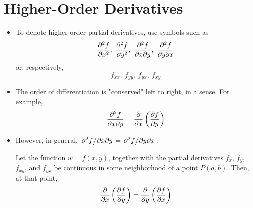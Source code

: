 \documentclass[../main.tex]{subfiles}
\begin{document}
\section{Higher-Order Derivatives}
\begin{itemize}
    \item {}To denote higher-order partial derivatives, use symbols such as
    \begin{equation*}
        \pdv[2]{f}{x},\ \pdv[2]{f}{y},\ \pdv{f}{x}{y},\ \pdv{f}{y}{x}
    \end{equation*}
    or, respectively,
    \begin{equation*}
        f_{xx},\ f_{yy},\ f_{yx},\ f_{xy}
    \end{equation*}
    \item The order of differentiation is "conserved" left to right, in a sense. For example,
    \begin{equation*}
        \pdv{f}{x}{y} = \pdv{x}\left( \pdv{f}{y} \right)
    \end{equation*}
    \item However, in general, $\pdv*{f}{x}{y}=\pdv*{f}{y}{x}$:
    \begin{thm}\label{thm:pdvOrdering}
        Let the function $w=f(x,y)$, together with the partial derivatives $f_x$, $f_y$, $f_{xy}$, and $f_{yx}$ be continuous in some neighborhood of a point $P(a,b)$. Then, at that point,
        \begin{equation*}
            \pdv{x}\left( \pdv{f}{y} \right) = \pdv{y}\left( \pdv{f}{x} \right)
        \end{equation*}
        \begin{figure}[h!]
            \centering
\end{figure}
\end{thm}
\end{itemize}
\end{document}
